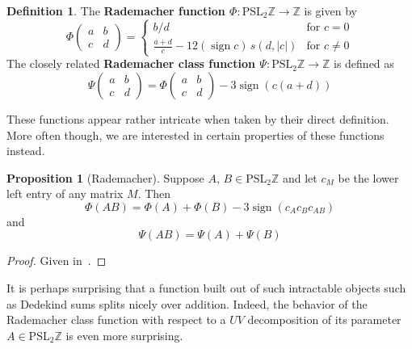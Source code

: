 \documentclass[12pt,twoside]{reedthesis}
\theoremstyle{definition}
\newtheorem{defn}[thm]{Definition}
\newtheorem{prop}[thm]{Proposition}
\newcommand{\Z}{\mathbb{Z}}
\newcommand{\PSLZ}{\mathrm{PSL}_2{\Z}}
\DeclareMathOperator{\sign}{sign}
\newcommand{\defnphrase}[1]{\textbf{#1}}
\begin{document}
\begin{defn}
  The \defnphrase{Rademacher function $\Phi : \PSLZ \to \Z$} is given by
  \begin{equation*}
    \Phi \begin{pmatrix}
      a & b \\
      c & d
    \end{pmatrix} = \begin{cases}
    b/d & \text{for $c = 0$} \\
    \frac{a + d}{c} - 12 (\sign c)\, s(d, |c|) & \text{for $c \neq 0$}
    \end{cases}
  \end{equation*}
  The closely related \defnphrase{Rademacher class function $\Psi : \PSLZ \to \Z$} is defined as
  \begin{equation*}
    \Psi \begin{pmatrix}
      a & b \\ c & d
    \end{pmatrix} = \Phi \begin{pmatrix}
      a & b \\ c & d
    \end{pmatrix} - 3 \sign(c(a + d))
  \end{equation*}
\end{defn}

These functions appear rather intricate when taken by their direct definition. More often though, we are interested in certain properties of these functions instead.

\begin{prop}[Rademacher]
 Suppose $A,\, B \in \PSLZ$ and let $c_M$ be the lower left entry of any matrix $M$.
 Then
 \begin{equation*}
   \Phi(AB) = \Phi(A) + \Phi(B) - 3 \sign(c_A c_B c_{AB})
 \end{equation*}
 and
 \begin{equation*}
   \Psi(AB) = \Psi(A) + \Psi(B)
 \end{equation*}
\end{prop}

\begin{proof}
  Given in~\cite{rademacher1956}.
\end{proof}

It is perhaps surprising that a function built out of such intractable objects such as Dedekind sums splits nicely over addition. Indeed, the behavior of the Rademacher class function with respect to a $UV$ decomposition of its parameter $A \in \PSLZ$ is even more surprising.
\end{document}
